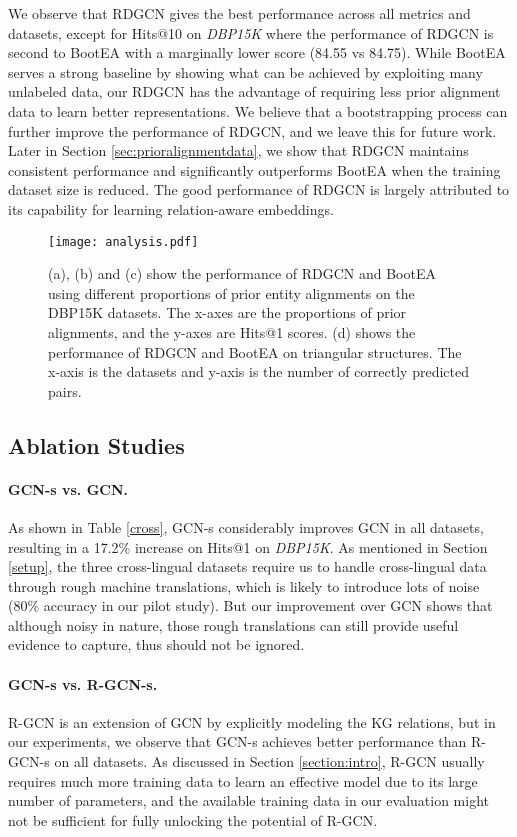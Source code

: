 \documentclass{article}
\begin{document}
We observe that RDGCN gives the best performance across all metrics and datasets, except for Hits@10 on \textit{DBP15K}
where the performance of RDGCN is second to BootEA with a marginally lower score (84.55 vs 84.75).
While BootEA serves a strong baseline by showing what can be achieved by exploiting many unlabeled data, our RDGCN has the advantage of
requiring less prior alignment data to learn better representations. We believe that a bootstrapping process can further improve the
performance of RDGCN, and we leave this for future work. Later in Section \ref{sec:prioralignmentdata}, we show that RDGCN maintains
consistent performance and significantly outperforms BootEA when the training dataset size is reduced. The good performance of RDGCN is
largely attributed to its capability for learning relation-aware embeddings. 


\begin{figure*}[t!]
	\centering
	\texttt{[image: analysis.pdf]}
	\caption{(a), (b) and (c) show the performance of RDGCN and BootEA using different proportions of prior entity alignments on the DBP15K datasets. The x-axes are the proportions of prior alignments, and the y-axes are Hits@1 scores. (d) shows the performance of RDGCN and BootEA on triangular structures. The x-axis is the datasets and y-axis is the number of correctly predicted pairs.}
	\label{analysis}
	\vspace{-2mm}
\end{figure*}

\subsection{Ablation Studies}

\paragraph{GCN-s vs. GCN.} As shown in Table \ref{cross}, GCN-s considerably improves GCN in all datasets, resulting in a
17.2\% increase on Hits@1 on \textit{DBP15K}. As mentioned in Section \ref{setup}, the three cross-lingual datasets require us to handle cross-lingual data through rough machine translations, which is likely to introduce lots of noise (80\% accuracy in our pilot study). But our improvement over GCN shows that although noisy in nature, those rough translations can still provide useful evidence to capture, thus should not be ignored.

\paragraph{GCN-s vs. R-GCN-s.} R-GCN is an extension of GCN by explicitly modeling the KG relations, but in our experiments, we observe that GCN-s achieves better performance than R-GCN-s on all datasets. As discussed in Section \ref{section:intro}, R-GCN usually requires much more training data to learn an effective model due to its large number of parameters, and the available training data in our evaluation might not be sufficient for fully
unlocking the potential of R-GCN.
\end{document}
